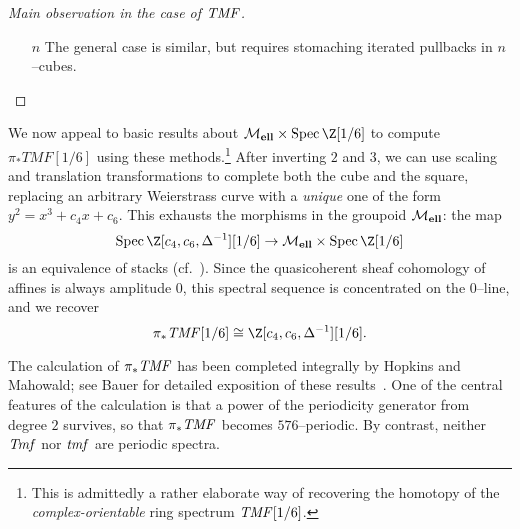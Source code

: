 \begin{proof}[{Main observation in the case of \(\mathit{TMF}\)}]
\begin{enumerate}
\begin{figure}
\begin{center}
    \end{center}
    \caption{Two expressions of the same cubical pullback.}\label{HypercubesFigure}
\end{figure}
    \item[\(n\)] The general case is similar, but requires stomaching iterated pullbacks in \(n\)--cubes. \qedhere
\end{enumerate}
\end{proof}

\begin{example}
We now appeal to basic results about \(\moduli{ell} \times \Spec \Z[1/6]\) to compute \(\pi_* TMF[1/6]\) using these methods.\footnote{This is admittedly a rather elaborate way of recovering the homotopy of the \emph{complex-orientable} ring spectrum \(\mathit{TMF}[1/6]\).}  After inverting \(2\) and \(3\), we can use scaling and translation transformations to complete both the cube and the square, replacing an arbitrary Weierstrass curve with a \emph{unique} one of the form \(y^2 = x^3 + c_4 x + c_6\).  This exhausts the morphisms in the groupoid \(\mathcal{M}_{\mathbf{ell}}\): the map \[\Spec \Z[c_4, c_6, \Delta^{-1}][1/6] \to \moduli{ell} \times \Spec \Z[1/6]\] is an equivalence of stacks (cf.\ ).  Since the quasicoherent sheaf cohomology of affines is always amplitude \(0\), this spectral sequence is concentrated on the \(0\)--line, and we recover \[\pi_* \TMF[1/6] \cong \Z[c_4, c_6, \Delta^{-1}][1/6].\]
\end{example}

\begin{remark}
The calculation of \(\pi_* \mathit{TMF}\) has been completed integrally by Hopkins and Mahowald; see Bauer for detailed exposition of these results~\cite{BauerTMF}.  One of the central features of the calculation is that a power of the periodicity generator from degree \(2\) survives, so that \(\pi_* \mathit{TMF}\) becomes \(576\)--periodic.  By contrast, neither \(\mathit{Tmf}\) nor \(\mathit{tmf}\) are periodic spectra.
\end{remark}









